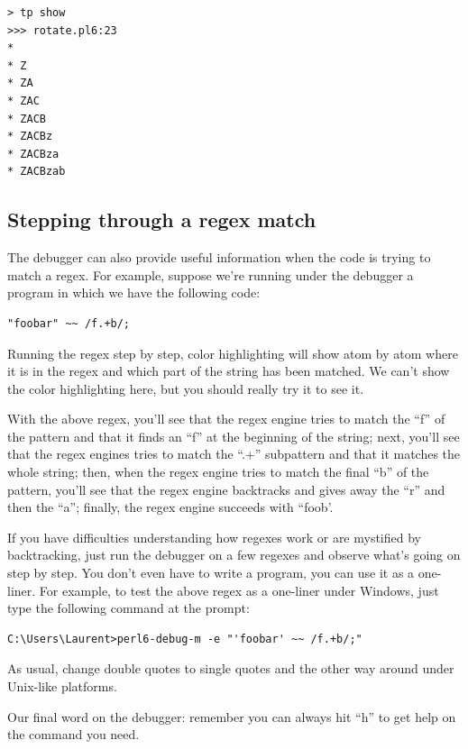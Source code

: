 \begin{verbatim}
> tp show
>>> rotate.pl6:23
*
* Z
* ZA
* ZAC
* ZACB
* ZACBz
* ZACBza
* ZACBzab
\end{verbatim}

\subsection{Stepping through a regex match}
\label{regex-debugging}
The debugger can also provide useful information when the 
code is trying to match a regex. For example, suppose we're 
running under the debugger a program in which we have the 
following code:

\begin{verbatim}
"foobar" ~~ /f.+b/;
\end{verbatim}

Running the regex step by step, color highlighting will show 
atom by atom where it is in the regex and which part of the 
string has been matched. We can't show the color highlighting 
here, but you should really try it to see it.

With the above regex, you'll see that 
the regex engine tries to match the ``f'' of the pattern and that 
it finds an ``f'' at the beginning of the string; next, you'll see 
that the regex engines tries to match the ``.+'' subpattern and 
that it matches the whole string; then, when the regex engine 
tries to match the final ``b'' of the pattern, you'll see that 
the regex engine backtracks and gives away the ``r'' and then the 
``a''; finally, the regex engine succeeds with ``foob'.

If you have difficulties understanding how regexes work or are 
mystified by backtracking, just run the debugger on a few 
regexes and observe what's going on step by step. You don't 
even have to write a program, you can use it as a one-liner. 
For example, to test the above regex as a one-liner under  
Windows, just type the following command at the prompt:

\begin{verbatim}
C:\Users\Laurent>perl6-debug-m -e "'foobar' ~~ /f.+b/;"
\end{verbatim}

As usual, change double quotes to single quotes and the other 
way around under Unix-like platforms.

Our final word on the debugger: remember you can always hit 
``h'' to get help on the command you need. 


